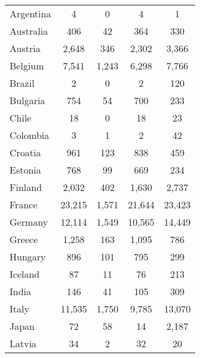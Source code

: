 \begin{longtable}{lcccc}
Argentina   & 4            & 0            & 4                    & 1                   \\
Australia   & 406          & 42           & 364                  & 330                 \\
Austria     & 2,648         & 346          & 2,302                 & 3,366                \\
Belgium     & 7,541         & 1,243         & 6,298                 & 7,766                \\
Brazil      & 2            & 0            & 2                    & 120                 \\
Bulgaria    & 754          & 54           & 700                  & 233                 \\
Chile       & 18           & 0            & 18                   & 23                  \\
Colombia    & 3            & 1            & 2                    & 42                  \\
Croatia     & 961          & 123          & 838                  & 459                 \\
Estonia     & 768          & 99           & 669                  & 234                 \\
Finland     & 2,032         & 402          & 1,630                 & 2,737                \\
France      & 23,215        & 1,571         & 21,644                & 23,423               \\
Germany     & 12,114        & 1,549         & 10,565                & 14,449               \\
Greece      & 1,258         & 163          & 1,095                 & 786                 \\
Hungary     & 896          & 101          & 795                  & 299                 \\
Iceland     & 87           & 11           & 76                   & 213                 \\
India       & 146          & 41           & 105                  & 309                 \\
Italy       & 11,535        & 1,750         & 9,785                 & 13,070               \\
Japan       & 72           & 58           & 14                   & 2,187                \\
Latvia      & 34           & 2            & 32                   & 20                  \\

\end{longtable}
